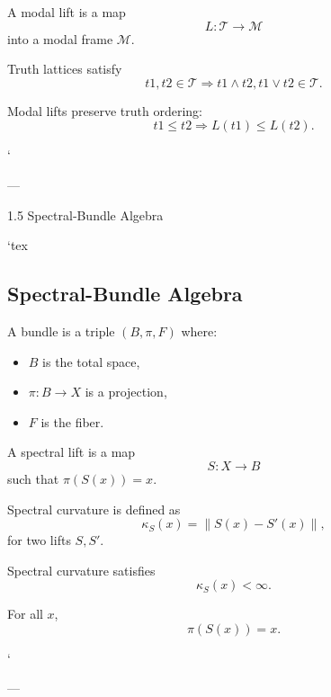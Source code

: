 \begin{definition}
A modal lift is a map
\[
L : \mathcal{T} \to \mathcal{M}
\]
into a modal frame $\mathcal{M}$.
\end{definition}

\begin{axiom}
Truth lattices satisfy
\[
t1, t2 \in \mathcal{T} \Rightarrow t1 \wedge t2, t1 \vee t2 \in \mathcal{T}.
\]
\end{axiom}

\begin{axiom}
Modal lifts preserve truth ordering:
\[
t1 \le t2 \Rightarrow L(t1) \le L(t2).
\]
\end{axiom}
`

---

1.5 Spectral‑Bundle Algebra

`tex
\subsection{Spectral-Bundle Algebra}

\begin{definition}[Bundle]
A bundle is a triple $(B, \pi, F)$ where:
\begin{itemize}
  \item $B$ is the total space,
  \item $\pi : B \to X$ is a projection,
  \item $F$ is the fiber.
\end{itemize}
\end{definition}

\begin{definition}
A spectral lift is a map
\[
S : X \to B
\]
such that $\pi(S(x)) = x$.
\end{definition}

\begin{definition}
Spectral curvature is defined as
\[
\kappa_S(x) = \| S(x) - S'(x) \|,
\]
for two lifts $S,S'$.
\end{definition}

\begin{axiom}
Spectral curvature satisfies
\[
\kappa_S(x) < \infty.
\]
\end{axiom}

\begin{axiom}
For all $x$,
\[
\pi(S(x)) = x.
\]
\end{axiom}
`

---

